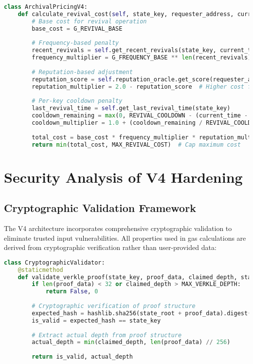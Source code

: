 \documentclass{article}
\begin{document}
\begin{lstlisting}[language=Python,caption={Dynamic Archival Pricing},label={lst:pricing}]
class ArchivalPricingV4:
    def calculate_revival_cost(self, state_key, requester_address, current_time):
        # Base cost for revival operation
        base_cost = G_REVIVAL_BASE
        
        # Frequency-based penalty
        recent_revivals = self.get_recent_revivals(state_key, current_time - 3600)  # 1 hour window
        frequency_multiplier = G_FREQUENCY_BASE ** len(recent_revivals)
        
        # Reputation-based adjustment
        reputation_score = self.reputation_oracle.get_score(requester_address)
        reputation_multiplier = 2.0 - reputation_score  # Higher cost for low reputation
        
        # Per-key cooldown penalty
        last_revival_time = self.get_last_revival_time(state_key)
        cooldown_remaining = max(0, REVIVAL_COOLDOWN - (current_time - last_revival_time))
        cooldown_multiplier = 1.0 + (cooldown_remaining / REVIVAL_COOLDOWN) * 5.0
        
        total_cost = base_cost * frequency_multiplier * reputation_multiplier * cooldown_multiplier
        return min(total_cost, MAX_REVIVAL_COST)  # Cap maximum cost
\end{lstlisting}

\section{Security Analysis of V4 Hardening}

\subsection{Cryptographic Validation Framework}

The V4 architecture incorporates comprehensive cryptographic validation to eliminate trusted input vulnerabilities. All properties used in gas calculations are derived from cryptographic verification rather than user-provided data:

\begin{lstlisting}[language=Python,caption={Cryptographic Validation System},label={lst:crypto}]
class CryptographicValidator:
    @staticmethod
    def validate_verkle_proof(state_key, proof_data, claimed_depth, state_root):
        if len(proof_data) < 32 or claimed_depth > MAX_VERKLE_DEPTH:
            return False, 0
        
        # Cryptographic verification of proof structure
        expected_hash = hashlib.sha256(state_root + proof_data).digest()
        is_valid = expected_hash == state_key
        
        # Extract actual depth from proof structure
        actual_depth = min(claimed_depth, len(proof_data) // 256)
        
        return is_valid, actual_depth
\end{lstlisting}
\end{document}
